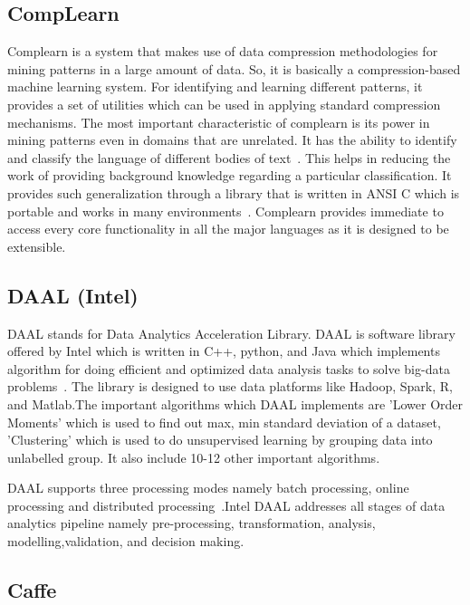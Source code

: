     \pv
    
\subsection{CompLearn}

Complearn is a system that makes use of data compression methodologies
for mining patterns in a large amount of data. So, it is basically a
compression-based machine learning system. For identifying and
learning different patterns, it provides a set of utilities which can
be used in applying standard compression mechanisms. The most
important characteristic of complearn is its power in mining patterns
even in domains that are unrelated. It has the ability to identify and
classify the language of different bodies of text~\cite{comp1}. This
helps in reducing the work of providing background knowledge regarding
a particular classification. It provides such generalization through a
library that is written in ANSI C which is portable and works in many
environments~\cite{comp1}. Complearn provides immediate to access
every core functionality in all the major languages as it is designed
to be extensible.

\subsection{DAAL (Intel)}

DAAL stands for Data Analytics Acceleration Library. DAAL is software
library offered by Intel which is written in C++, python, and Java
which implements algorithm for doing efficient and optimized data
analysis tasks to solve big-data problems~\cite{www-daal-wiki}. The
library is designed to use data platforms like Hadoop, Spark, R, and
Matlab.The important algorithms which DAAL implements are 'Lower Order
Moments' which is used to find out max, min standard deviation of a
dataset, 'Clustering' which is used to do unsupervised learning by
grouping data into unlabelled group. It also include 10-12 other
important algorithms.

DAAL supports three processing modes namely batch processing, online
processing and distributed processing~\cite{www-daal-official}.Intel
DAAL addresses all stages of data analytics pipeline namely
pre-processing, transformation, analysis, modelling,validation, and
decision making.

    \pv
    
    
\subsection{Caffe}

